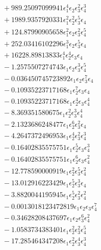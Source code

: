 \documentclass[10pt]{article}
\begin{document}
\begin{align*}
&{}  + 989.25097099941 \epsilon_{1}^{4} \epsilon_{2} \epsilon_{3}^{2} \epsilon_{4}^{3} \\
&{}  + 1989.9357920331 \epsilon_{1}^{2} \epsilon_{2}^{2} \epsilon_{3}^{5} \epsilon_{4} \\
&{}  + 124.87990905658 \epsilon_{1}^{2} \epsilon_{2} \epsilon_{3}^{2} \epsilon_{4}^{5} \\
&{}  + 252.03416102296 \epsilon_{1}^{3} \epsilon_{2} \epsilon_{3}^{5} \epsilon_{4} \\
&{}  + 16228.89813833 \epsilon_{1}^{4} \epsilon_{2}^{4} \epsilon_{3} \epsilon_{4} \\
&{}  - 1.2575507274743 \epsilon_{1} \epsilon_{2} \epsilon_{3}^{3} \epsilon_{4}^{5} \\
&{}  - 0.036450745723892 \epsilon_{1} \epsilon_{2} \epsilon_{3}^{7} \epsilon_{4} \\
&{}  - 0.10935223717168 \epsilon_{1} \epsilon_{2}^{7} \epsilon_{3} \epsilon_{4} \\
&{}  - 0.10935223717168 \epsilon_{1} \epsilon_{2}^{4} \epsilon_{3} \epsilon_{4}^{4} \\
&{}  - 8.369351580675 \epsilon_{1} \epsilon_{2}^{2} \epsilon_{3}^{3} \epsilon_{4}^{4} \\
&{}  - 2.1323686248477 \epsilon_{1} \epsilon_{2}^{6} \epsilon_{3}^{2} \epsilon_{4} \\
&{}  - 4.2647372496953 \epsilon_{1} \epsilon_{2}^{4} \epsilon_{3}^{2} \epsilon_{4}^{3} \\
&{}  - 0.16402835575751 \epsilon_{1} \epsilon_{2}^{5} \epsilon_{3} \epsilon_{4}^{3} \\
&{}  - 0.16402835575751 \epsilon_{1} \epsilon_{2}^{6} \epsilon_{3} \epsilon_{4}^{2} \\
&{}  - 12.778590000919 \epsilon_{1} \epsilon_{2}^{2} \epsilon_{3}^{5} \epsilon_{4}^{2} \\
&{}  - 13.012916223429 \epsilon_{1} \epsilon_{2}^{5} \epsilon_{3}^{3} \epsilon_{4} \\
&{}  - 3.8820044195945 \epsilon_{1} \epsilon_{2}^{5} \epsilon_{3}^{2} \epsilon_{4}^{2} \\
&{}  - 0.0013018123472819 \epsilon_{1} \epsilon_{2} \epsilon_{3} \epsilon_{4}^{7} \\
&{}  - 0.34628208437697 \epsilon_{1} \epsilon_{2} \epsilon_{3}^{6} \epsilon_{4}^{2} \\
&{}  - 1.0583734383401 \epsilon_{1} \epsilon_{2}^{2} \epsilon_{3}^{2} \epsilon_{4}^{5} \\
&{}  - 17.285464347208 \epsilon_{1} \epsilon_{2}^{2} \epsilon_{3}^{4} \epsilon_{4}^{3} \\

\end{align*}
\end{document}
